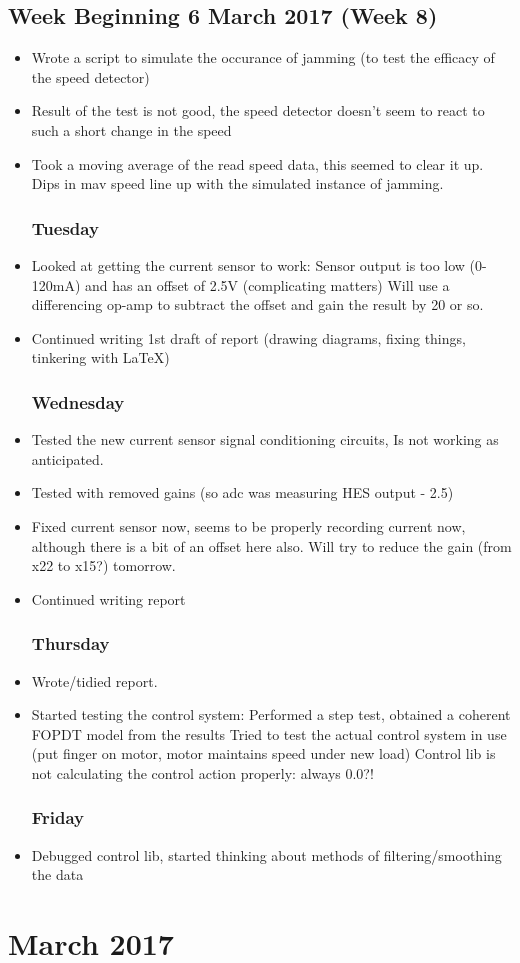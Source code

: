 \documentclass[a4]{report}
\def\mon{\subsection*{Monday}}
\def\tue{\subsection*{Tuesday}}
\def\wed{\subsection*{Wednesday}}
\def\thu{\subsection*{Thursday}}
\def\fri{\subsection*{Friday}}
\begin{document}
	\section{Week Beginning 6 March 2017 (Week 8)}
	\begin{itemize}
		\mon
		\item Wrote a script to simulate the occurance of jamming (to test the efficacy of the speed detector)
		\item Result of the test is not good, the speed detector doesn't seem to react to such a short change in the speed
		\item Took a moving average of the read speed data, this seemed to clear it up. Dips in mav speed line up with the simulated instance of jamming.
		\tue
		\item Looked at getting the current sensor to work:
		\subitem Sensor output is too low (0-120mA) and has an offset of 2.5V (complicating matters)
		\subitem Will use a differencing op-amp to subtract the offset and gain the result by 20 or so.
		\item Continued writing 1st draft of report (drawing diagrams, fixing things, tinkering with \LaTeX)
		\wed
		\item Tested the new current sensor signal conditioning circuits, Is not working as anticipated.
		\item Tested with removed gains (so adc was measuring HES output - 2.5)
		\item Fixed current sensor now, seems to be properly recording current now, although there is a bit of an offset here also. Will try to reduce the gain (from x22 to x15?) tomorrow.
		\item Continued writing report
		\thu
		\item Wrote/tidied report.
		\item Started testing the control system:
		\subitem Performed a step test, obtained a coherent FOPDT model from the results
		\subitem Tried to test the actual control system in use (put finger on motor, motor maintains speed under new load)
		\subitem Control lib is not calculating the control action properly: always 0.0?!
		\fri
		\item Debugged control lib, started thinking about methods of filtering/smoothing the data
	\end{itemize}
	\newpage
	\chapter{March 2017}
\end{document}
